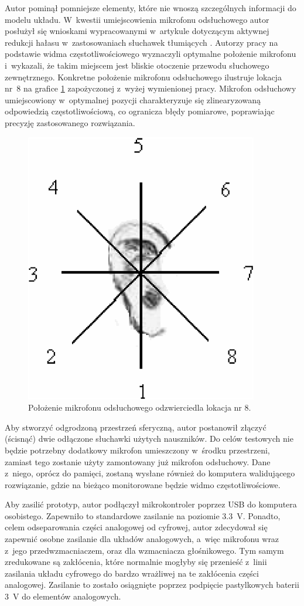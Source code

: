 Autor pominął pomniejsze elementy, które nie wnoszą szczególnych informacji do modelu układu. W~kwestii umiejscowienia mikrofonu odsłuchowego autor posłużył się wnioskami wypracowanymi w~artykule dotyczącym aktywnej redukcji hałasu w~zastosowaniach słuchawek tłumiących \cite{ANC4HP}. Autorzy pracy na podstawie widma częstotliwościowego wyznaczyli optymalne położenie mikrofonu i~wykazali, że takim miejscem jest bliskie otoczenie przewodu słuchowego zewnętrznego. Konkretne położenie mikrofonu odsłuchowego ilustruje lokacja nr~8 na grafice \ref{fig:error_mic_placement} zapożyczonej z~wyżej wymienionej pracy. %
Mikrofon odsłuchowy umiejscowiony w~optymalnej pozycji charakteryzuje się zlinearyzowaną odpowiedzią częstotliwościową, co ogranicza błędy pomiarowe, poprawiając precyzję zastosowanego rozwiązania. 
\begin{figure}[h!]
	\centering
	\includegraphics[scale=0.75]{../Assets/error_mic_placement.png}
	\caption{Położenie mikrofonu odsłuchowego odzwierciedla lokacja nr 8.}
	\label{fig:error_mic_placement}
\end{figure}

Aby stworzyć odgrodzoną przestrzeń sferyczną, autor postanowił złączyć (ścisnąć) dwie odłączone słuchawki użytych nauszników. Do celów testowych nie będzie potrzebny dodatkowy mikrofon umieszczony w~środku przestrzeni, zamiast tego zostanie użyty zamontowany już mikrofon odsłuchowy. Dane z~niego, oprócz do pamięci, zostaną wysłane również do komputera walidującego rozwiązanie, gdzie na bieżąco monitorowane będzie widmo częstotliwościowe.

Aby zasilić prototyp, autor podłączył mikrokontroler poprzez USB do komputera osobistego. Zapewniło to standardowe zasilanie na poziomie \SI{3.3}{\V}. Ponadto, celem odseparowania części analogowej od cyfrowej, autor zdecydował się zapewnić osobne zasilanie dla układów analogowych, a~więc mikrofonu wraz z~jego przedwzmacniaczem, oraz dla wzmacniacza głośnikowego. Tym samym zredukowane są zakłócenia, które normalnie mogłyby się przenieść z~linii zasilania układu cyfrowego do bardzo wrażliwej na te zakłócenia części analogowej. Zasilanie to zostało osiągnięte poprzez podpięcie pastylkowych baterii \SI{3}{\V} do elementów analogowych. 